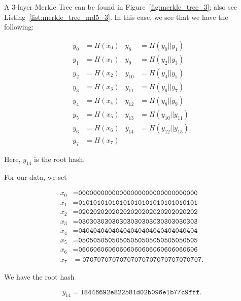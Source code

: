 \begin{example}

A 3-layer Merkle Tree can be found in Figure~\ref{fig:merkle_tree_3};
also see Listing~\ref{list:merkle_tree_md5_3}.
In this case, we see that we have the following:




\begin{align}
    y_{0}  &= H(x_{0})
        &
    y_{8}  &= H(y_{0}||y_{1}) \nonumber\\
    y_{1}  &= H(x_{1})
        &
    y_{9}  &= H(y_{2}||y_{3}) \nonumber\\
    y_{2}  &= H(x_{2})
        &
    y_{10} &= H(y_{4}||y_{5}) \nonumber\\
    y_{3}  &= H(x_{3})
        &
    y_{11} &= H(y_{6}||y_{7}) \nonumber\\
    y_{4}  &= H(x_{4})
        &
    y_{12} &= H(y_{8}||y_{9}) \nonumber\\
    y_{5}  &= H(x_{5})
        &
    y_{13} &= H(y_{10}||y_{11}) \nonumber\\
    y_{6}  &= H(x_{6})
        &
    y_{14} &= H(y_{12}||y_{13}). \nonumber\\
    y_{7}  &= H(x_{7})
    \label{eq:merkle_tree_3_def}
\end{align}

\noindent
Here, $y_{14}$ is the root hash.

For our data, we set

\begin{align}
    x_{0} &= \texttt{00000000000000000000000000000000}
        \nonumber\\
    x_{1} &= \texttt{01010101010101010101010101010101}
        \nonumber\\
    x_{2} &= \texttt{02020202020202020202020202020202}
        \nonumber\\
    x_{3} &= \texttt{03030303030303030303030303030303}
        \nonumber\\
    x_{4} &= \texttt{04040404040404040404040404040404}
        \nonumber\\
    x_{5} &= \texttt{05050505050505050505050505050505}
        \nonumber\\
    x_{6} &= \texttt{06060606060606060606060606060606}
        \nonumber\\
    x_{7} &= \texttt{07070707070707070707070707070707}.
\end{align}

\noindent
We have the root hash

\begin{equation}
    y_{14} = \texttt{18446692e822581d02b096e1b77c9fff}.
    \label{eq:merkle_tree_3_root_hash}
\end{equation}
\end{example}

